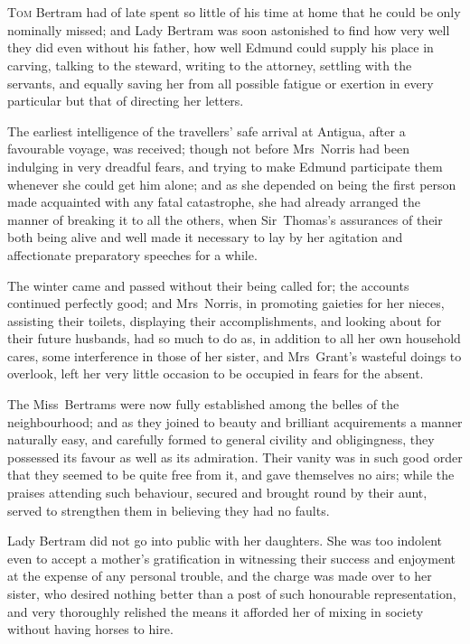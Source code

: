 \chapter[Chapter \thechapter]{} 

 \lettrine[lraise=0.3]{T}{om} Bertram had of late spent so little of his time at home that he could be only nominally missed; and Lady Bertram was soon astonished to find how very well they did even without his father, how well Edmund could supply his place in carving, talking to the steward, writing to the attorney, settling with the servants, and equally saving her from all possible fatigue or exertion in every particular but that of directing her letters.

The earliest intelligence of the travellers' safe arrival at Antigua, after a favourable voyage, was received; though not before Mrs~Norris had been indulging in very dreadful fears, and trying to make Edmund participate them whenever she could get him alone; and as she depended on being the first person made acquainted with any fatal catastrophe, she had already arranged the manner of breaking it to all the others, when Sir~Thomas's assurances of their both being alive and well made it necessary to lay by her agitation and affectionate preparatory speeches for a while.

The winter came and passed without their being called for; the accounts continued perfectly good; and Mrs~Norris, in promoting gaieties for her nieces, assisting their toilets, displaying their accomplishments, and looking about for their future husbands, had so much to do as, in addition to all her own household cares, some interference in those of her sister, and Mrs~Grant's wasteful doings to overlook, left her very little occasion to be occupied in fears for the absent.

The Miss~Bertrams were now fully established among the belles of the neighbourhood; and as they joined to beauty and brilliant acquirements a manner naturally easy, and carefully formed to general civility and obligingness, they possessed its favour as well as its admiration. Their vanity was in such good order that they seemed to be quite free from it, and gave themselves no airs; while the praises attending such behaviour, secured and brought round by their aunt, served to strengthen them in believing they had no faults.

Lady Bertram did not go into public with her daughters. She was too indolent even to accept a mother's gratification in witnessing their success and enjoyment at the expense of any personal trouble, and the charge was made over to her sister, who desired nothing better than a post of such honourable representation, and very thoroughly relished the means it afforded her of mixing in society without having horses to hire.

